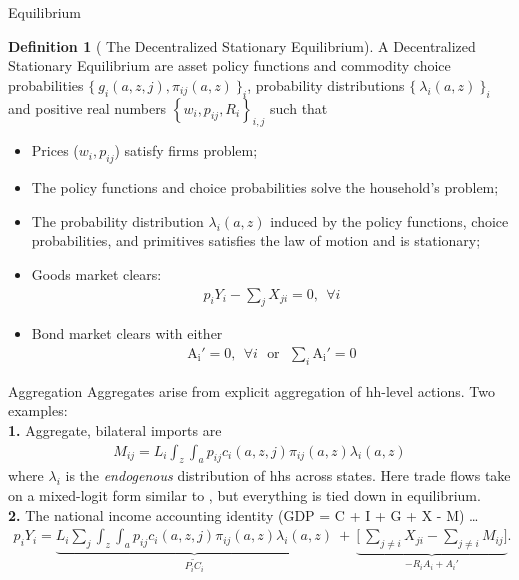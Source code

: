 \documentclass[9pt,pdftex,aspectratio=1610]{beamer}
\theoremstyle{definition}
\newtheorem{df}{Definition}
\begin{document}
\begin{frame}[t]{Equilibrium}
\vspace{-.25cm}
\smallskip
{\small
\begin{df}[ {\normalsize The Decentralized Stationary Equilibrium}] \normalfont A Decentralized Stationary Equilibrium are asset policy functions and commodity choice probabilities $\{\  g_{i}(a, z, j), \pi_{ij}(a, z) \ \}_{i}$, probability distributions $\{ \ \lambda_i(a, z) \ \}_{i}$ and positive real numbers $\left \{w_i, p_{ij}, R_i\right \}_{i,j}$ such that
\begin{itemize}
\item[i]  Prices ($w_i, p_{ij}$) satisfy firms problem;
\item[ii] The policy functions and choice probabilities solve the household's problem;
\item[iii] The probability distribution $\lambda_i(a, z)$ induced by the policy functions, choice probabilities, and primitives satisfies the law of motion and is stationary;
\item[iv] Goods market clears:
\begin{align*}
p_{i} Y_{i} - \sum_{j}  X_{ji} = 0, \ \ \forall i
\end{align*}
\item[v] Bond market clears with either
\begin{align*}
\mathrm{A_i'} = 0, \ \ \forall i \ \ \ \mbox{or} \ \ \ \sum_{i}\mathrm{A_i'} = 0
\end{align*}
\end{itemize}
\end{df}
}
\end{frame}


\begin{frame}[t]{Aggregation}
\smallskip
Aggregates arise from explicit aggregation of hh-level actions. Two examples:\\
\medskip
\medskip
\textbf{1.} Aggregate, bilateral imports are
\begin{align*}
M_{ij} = L_i \int_{z} \int_{a}  p_{ij} c_{i}(a, z, j) \pi_{ij}(a, z) \lambda_i(a, z)
\end{align*}
where $\lambda_i$ is the \emph{endogenous} distribution of hhs across states. Here trade flows take on a mixed-logit form similar to \citet*{berry1995automobile}, but everything is tied down in equilibrium. \\
\bigskip
\bigskip
\textbf{2.} The national income accounting identity (GDP = C + I + G + X - M) \ldots
\begin{align*}
p_{i} Y_{i}  =  \underbrace{L_{i} \sum_{j} \int_{z} \int_{a}  p_{ij} c_{i}(a, z, j) \pi_{ij}(a, z) \lambda_i(a, z)}_{\widetilde{P_{i} C_i}} \ + \ \underbrace{\bigg[\ \sum_{j\neq i}X_{ji} -  \sum_{j\neq i}M_{ij} \bigg]}_{-R_{i}A_i + A_{i}'}.
\end{align*}
\end{frame}
\end{document}
